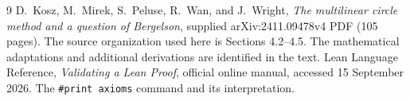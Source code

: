 \documentclass[11pt]{article}
\theoremstyle{definition}
\begin{document}
\begin{thebibliography}{9}
D.~Kosz, M.~Mirek, S.~Peluse, R.~Wan, and J.~Wright,
\emph{The multilinear circle method and a question of Bergelson},
supplied arXiv:2411.09478v4 PDF (105 pages).
The source organization used here is Sections 4.2--4.5.
The mathematical adaptations and additional derivations are identified in the text.
Lean Language Reference, \emph{Validating a Lean Proof}, official online manual,
accessed 15 September 2026.  The \texttt{\#print axioms} command and its interpretation.
\end{thebibliography}
\end{document}

